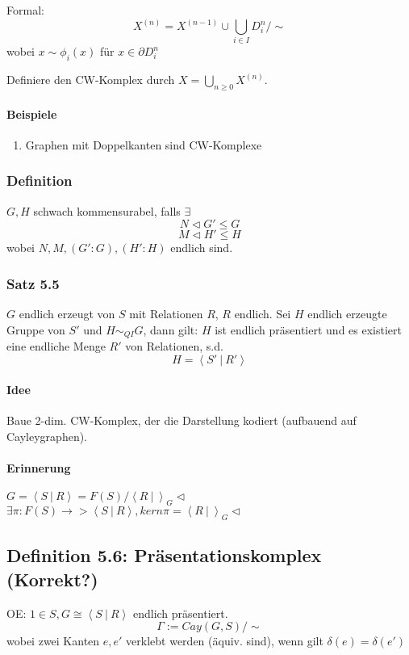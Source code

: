 \documentclass{article}
\newcommand{\grp}[2]{\left\langle #1~|~#2 \right\rangle}
\begin{document}
Formal:
\[X^{(n)} = X^{(n-1)} \cup \bigcup_{i\in I}D^n_i/\sim \]
wobei $x\sim \phi_i(x)$ für $x \in \partial D_i^n$

Definiere den CW-Komplex durch $X = \bigcup_{n\geq 0} X^{(n)}$.

\paragraph{Beispiele}
\begin{enumerate}
	\item Graphen mit Doppelkanten sind CW-Komplexe
\end{enumerate}


\subsubsection{Definition}
$G,H$ schwach kommensurabel, falls $\exists$
\[N \vartriangleleft G' \leq G\]
\[M \vartriangleleft H' \leq H\]
wobei $N,M, (G':G), (H':H)$ endlich sind.

\subsubsection{Satz 5.5}
$G$ endlich erzeugt von $S$ mit Relationen $R$, $R$ endlich. Sei $H$ endlich erzeugte Gruppe von $S'$ und $H\sim_{QI}G$, dann gilt:
$H$ ist endlich präsentiert und es existiert eine endliche Menge $R'$ von Relationen, s.d.
\[H = \grp{S'}{R'}\]
\paragraph{Idee}
Baue 2-dim. CW-Komplex, der die Darstellung kodiert (aufbauend auf Cayleygraphen).
\paragraph{Erinnerung}
$G = \grp{S}{R} = F(S)/ \grp{R}{}_G\vartriangleleft$\\
$\exists \pi: F(S) \rightarrow > \grp{S}{R}, kern \pi = \grp{R}{}_G\vartriangleleft$ 

\subsection{Definition 5.6: Präsentationskomplex (Korrekt?)}
OE: $1 \in S, G \cong \grp{S}{R}$ endlich präsentiert.
\[\Gamma := Cay(G,S)/\sim \]
wobei zwei Kanten $e, e'$ verklebt werden (äquiv. sind), wenn gilt $\delta(e) = \delta(e')$\\\\
\end{document}

